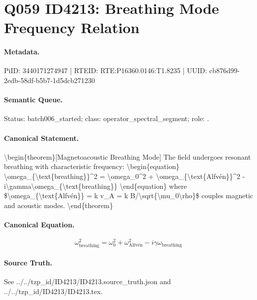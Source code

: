 \section*{Q059 ID4213: Breathing Mode Frequency Relation}
\paragraph{Metadata.}
PiID: 3440171274947 | RTEID: RTE:P16360.0146:T1.8235 | UUID: cb876d99-2edb-58df-b5b7-1d5dcb271230

\paragraph{Semantic Queue.}
Status: batch006\_started; class: operator\_spectral\_segment; role: .

\paragraph{Canonical Statement.}
\textbackslash{}begin\{theorem\}[Magnetoacoustic Breathing Mode] The field undergoes resonant breathing with characteristic frequency: \textbackslash{}begin\{equation\} \textbackslash{}omega\_\{\textbackslash{}text\{breathing\}\}\textasciicircum{}2 = \textbackslash{}omega\_0\textasciicircum{}2 + \textbackslash{}omega\_\{\textbackslash{}text\{Alfvén\}\}\textasciicircum{}2 - i\textbackslash{}gamma\textbackslash{}omega\_\{\textbackslash{}text\{breathing\}\} \textbackslash{}end\{equation\} where \$\textbackslash{}omega\_\{\textbackslash{}text\{Alfvén\}\} = k v\_A = k B/\textbackslash{}sqrt\{\textbackslash{}mu\_0\textbackslash{}rho\}\$ couples magnetic and acoustic modes. \textbackslash{}end\{theorem\}

\paragraph{Canonical Equation.}
\[
\begin{equation} \omega_{\text{breathing}}^2 = \omega_0^2 + \omega_{\text{Alfvén}}^2 - i\gamma\omega_{\text{breathing}} \end{equation}
\]

\paragraph{Source Truth.}
See ../../tzp\_id/ID4213/ID4213.source\_truth.json and ../../tzp\_id/ID4213/ID4213.tex.
